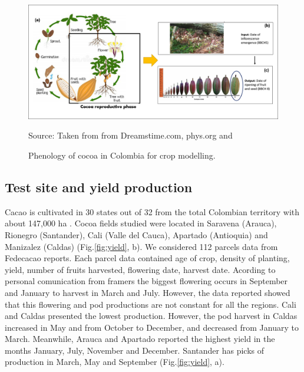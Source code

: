 \documentclass[gene,journal,article,submit,moreauthors,pdftex]{Definitions/mdpi}
\begin{document}
\begin{figure}[h!]
	\centering
	\includegraphics[scale=0.4]{images/phenology.png}\\
	\caption{\footnotesize {Phenology of cocoa in Colombia for crop modelling.\\}} 
	\footnotesize{Source: Taken from from Dreamstime.com, phys.org \citep{toledo2021} and \cite{lopez2018}}
	\label{fig:pheno}
\end{figure}



\subsection{Test site and yield production }
Cacao is cultivated in 30 states out of 32 from the total Colombian territory with about 147,000 ha \citep{Meza2021}. Cocoa fields studied were located in Saravena (Arauca), Rionegro (Santander), Cali (Valle del Cauca), Apartado (Antioquia) and Manizalez (Caldas) (Fig.\ref{fig:yield}, b). We considered 112 parcels data from Fedecacao reports. Each parcel data contained age of crop, density of planting, yield, number of fruits harvested, flowering date, harvest date.   Acording to personal comunication from framers the biggest flowering occurs in September and January to harvest in March and July. However, the data reported showed that this flowering and pod productions are not constant for all the regions.  Cali and Caldas presented the lowest production. However, the pod harvest in Caldas increased in May and from October to December, and decreased from January to March.  Meanwhile, Arauca and Apartado reported the highest yield in the months January, July, November and December. Santander has picks of production in March, May and September (Fig.\ref{fig:yield}, a).
\end{document}
